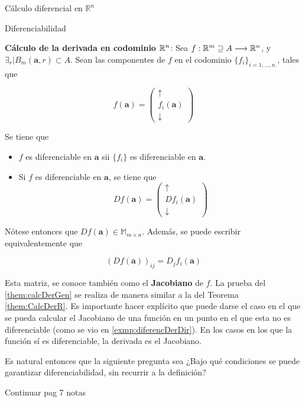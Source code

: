 \begin{chapter}{Cálculo diferencial en $\mathbb{R}^n$}
\begin{section}{Diferenciabilidad}
\begin{them}
\label{them:calcDerGen}
\textbf{Cálculo de la derivada en codominio $\mathbb{R}^n$}: Sea $f: \mathbb{R}^m \supseteq A \longrightarrow \mathbb{R}^n$, y $\exists_r | B_m(\textbf{a},r) \subset A$. Sean las componentes de $f$ en el codominio $\{f_i\}_{i=1,...,n.}$, tales que

\begin{equation*}
    f(\textbf{a}) = \left(\begin{array}{c}
         \uparrow \\
         f_i(\textbf{a}) \\
         \downarrow
    \end{array}\right)
\end{equation*}

Se tiene que

\begin{itemize}
    \item $f$ es diferenciable en $\textbf{a}$ sii $\{f_i\}$ es diferenciable en $\textbf{a}$.
    \item Si $f$ es diferenciable en $\textbf{a}$, se tiene que
    \begin{equation}
        Df(\textbf{a}) = \left( \begin{array}{c}
             \uparrow\\
             Df_i(\textbf{a}) \\
             \downarrow
        \end{array} \right)
    \end{equation}
\end{itemize}

\end{them}

Nótese entonces que $Df(\textbf{a}) \in \mathbb{M}_{m\times n}$. Además, se puede escribir equivalentemente que 

\begin{equation*}
    (Df(\textbf{a}))_{ij} = D_jf_i(\textbf{a})
\end{equation*}

Esta matriz, se conoce también como el \textbf{Jacobiano} de $f$. La prueba del \cref{them:calcDerGen} se realiza de manera similar a la del Teorema \ref{them:CalcDerR}. Es importante hacer explícito que puede darse el caso en el que se pueda calcular el Jacobiano de una función en un punto en el que esta no es diferenciable (como se vio en \cref{exmp:diferencDerDir}). En los casos en los que la función sí es diferenciable, la derivada es el Jacobiano.

Es natural entonces que la siguiente pregunta sea ¿Bajo qué condiciones se puede garantizar diferenciabilidad, sin recurrir a la definición?

Continuar pag 7 notas

\end{section}

\end{chapter}
